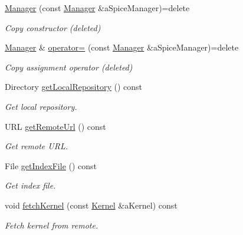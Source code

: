 \begin{DoxyCompactItemize}
\item 
\hyperlink{classlibrary_1_1physics_1_1env_1_1ephem_1_1spice_1_1_manager_aa4ec6e585791cf27dfa66a3b0ced57fb}{Manager} (const \hyperlink{classlibrary_1_1physics_1_1env_1_1ephem_1_1spice_1_1_manager}{Manager} \&a\+Spice\+Manager)=delete
\begin{DoxyCompactList}\small\item\em Copy constructor (deleted) \end{DoxyCompactList}\item 
\hyperlink{classlibrary_1_1physics_1_1env_1_1ephem_1_1spice_1_1_manager}{Manager} \& \hyperlink{classlibrary_1_1physics_1_1env_1_1ephem_1_1spice_1_1_manager_a9cefb3ab334147e42eaadaa1229b0048}{operator=} (const \hyperlink{classlibrary_1_1physics_1_1env_1_1ephem_1_1spice_1_1_manager}{Manager} \&a\+Spice\+Manager)=delete
\begin{DoxyCompactList}\small\item\em Copy assignment operator (deleted) \end{DoxyCompactList}\item 
Directory \hyperlink{classlibrary_1_1physics_1_1env_1_1ephem_1_1spice_1_1_manager_a88cdb0d3353d86f1eabad722cfb8ba2b}{get\+Local\+Repository} () const
\begin{DoxyCompactList}\small\item\em Get local repository. \end{DoxyCompactList}\item 
U\+RL \hyperlink{classlibrary_1_1physics_1_1env_1_1ephem_1_1spice_1_1_manager_a583bd086060b607e617ee1676fa54f67}{get\+Remote\+Url} () const
\begin{DoxyCompactList}\small\item\em Get remote U\+RL. \end{DoxyCompactList}\item 
File \hyperlink{classlibrary_1_1physics_1_1env_1_1ephem_1_1spice_1_1_manager_a904b232e125037b276bd6c2bf86e16ab}{get\+Index\+File} () const
\begin{DoxyCompactList}\small\item\em Get index file. \end{DoxyCompactList}\item 
void \hyperlink{classlibrary_1_1physics_1_1env_1_1ephem_1_1spice_1_1_manager_a52e06b9cc1180effbd4bdd30cc488bb4}{fetch\+Kernel} (const \hyperlink{classlibrary_1_1physics_1_1env_1_1ephem_1_1spice_1_1_kernel}{Kernel} \&a\+Kernel) const
\begin{DoxyCompactList}\small\item\em Fetch kernel from remote. \end{DoxyCompactList}\item 

\end{DoxyCompactItemize}
